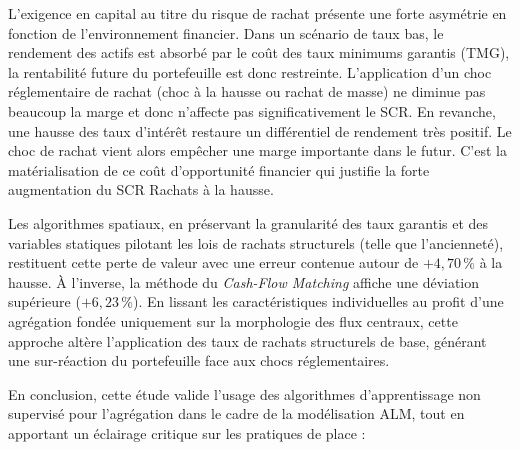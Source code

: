 L'exigence en capital au titre du risque de rachat présente une forte asymétrie en fonction de l'environnement financier. Dans un scénario de taux bas, le rendement des actifs est absorbé par le coût des taux minimums garantis (TMG), la rentabilité future du portefeuille est donc restreinte. L'application d'un choc réglementaire de rachat (choc à la hausse ou rachat de masse) ne diminue pas beaucoup la marge et donc n'affecte pas significativement le SCR. En revanche, une hausse des taux d'intérêt restaure un différentiel de rendement très positif. Le choc de rachat vient alors empêcher une marge importante dans le futur. C'est la matérialisation de ce coût d'opportunité financier qui justifie la forte augmentation du SCR Rachats à la hausse.

Les algorithmes spatiaux, en préservant la granularité des taux garantis et des variables statiques pilotant les lois de rachats structurels (telle que l'ancienneté), restituent cette perte de valeur avec une erreur contenue autour de $+4{,}70\,\%$ à la hausse. À l'inverse, la méthode du \textit{Cash-Flow Matching} affiche une déviation supérieure ($+6{,}23\,\%$). En lissant les caractéristiques individuelles au profit d'une agrégation fondée uniquement sur la morphologie des flux centraux, cette approche altère l'application des taux de rachats structurels de base, générant une sur-réaction du portefeuille face aux chocs réglementaires.

En conclusion, cette étude valide l'usage des algorithmes d'apprentissage non supervisé pour l'agrégation dans le cadre de la modélisation ALM, tout en apportant un éclairage critique sur les pratiques de place :


